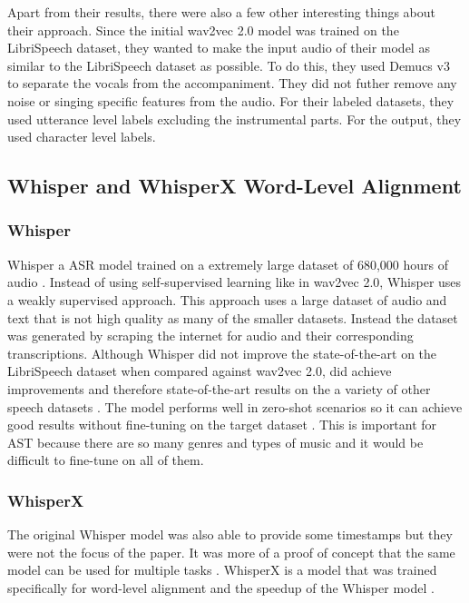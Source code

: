 \documentclass[letterpaper, 12pt]{article}
\begin{document}
\begin{multicols*}{2}
Apart from their results, there were also a few other interesting things about their approach. Since
the initial wav2vec 2.0 model was trained on the LibriSpeech dataset, they wanted to make the input
audio of their model as similar to the LibriSpeech dataset as possible. To do this, they used
Demucs v3 \citep{Demucs} to separate the vocals from the accompaniment. They did not futher remove any
noise or singing specific features from the audio. For their labeled datasets, they used
utterance level labels excluding the instrumental parts. For the output, they used character level
labels.

\subsection{Whisper and WhisperX Word-Level Alignment}

\subsubsection{Whisper}
Whisper a ASR model trained on a extremely large dataset of 680,000 hours of audio \citep{whisper}.
Instead of using self-supervised learning like in wav2vec 2.0, Whisper uses a weakly supervised
approach. This approach uses a large dataset of audio and text that is not high quality as many of
the smaller datasets. Instead the dataset was generated by scraping the internet for audio and
their corresponding transcriptions. Although Whisper did not improve the state-of-the-art on the
LibriSpeech dataset when compared against wav2vec 2.0, did achieve improvements and therefore
state-of-the-art results on the a variety of other speech datasets \citep{whisper}. The model
performs well in zero-shot scenarios so it can achieve good results without fine-tuning on the
target dataset \citep{whisper}. This is important for AST because there are so many genres and
types of music and it would be difficult to fine-tune on all of them.

\subsubsection{WhisperX}
The original Whisper model was also able to provide some timestamps but they were not the focus of
the paper. It was more of a proof of concept that the same model can be used for multiple tasks
\citep{whisper}. WhisperX is a model that was trained specifically for word-level alignment and
the speedup of the Whisper model \citep{whisperX}.


\end{multicols*}
\end{document}

